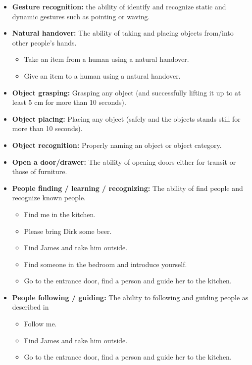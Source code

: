 \begin{itemize}
	\item \textbf{Gesture recognition:} the ability of identify and recognize static and dynamic gestures such as pointing or waving.

	\item \textbf{Natural handover:} The ability of taking and placing objects from/into other people's hands.
	\begin{itemize}
		\item Take an item from a human using a natural handover.
		\item Give an item to a human using a natural handover.
	\end{itemize}

	\item \textbf{Object grasping:} Grasping any object (and successfully lifting it up to at least 5 cm for more than 10 seconds). \\

	\item \textbf{Object placing:} Placing any object (safely and the objects stands still for more than 10 seconds). \\

	\item \textbf{Object recognition:} Properly naming an object or object category. \\

	\item \textbf{Open a door/drawer:} The ability of opening doors either for transit or those of furniture.

	\item \textbf{People finding / learning / recognizing:} The ability of find people and recognize known people.
	\begin{itemize}
		\item Find me in the kitchen.
		\item Please bring Dirk some beer.
		\item Find James and take him outside.
		\item Find someone in the bedroom and introduce yourself.
		\item Go to the entrance door, find a person and guide her to the kitchen.
	\end{itemize}

	\item \textbf{People following / guiding:} The ability to following and guiding people as described in 
	\begin{itemize}
		\item Follow me.
		\item Find James and take him outside.
		\item Go to the entrance door, find a person and guide her to the kitchen.
	\end{itemize}


\end{itemize}
